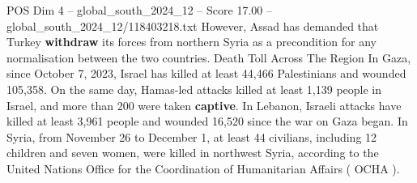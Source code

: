 \begin{textsample}{POS Dim 4 – global\_south\_2024\_12 – Score 17.00 – global\_south\_2024\_12/118403218.txt}
However, Assad has demanded that Turkey \textbf{withdraw} its forces from northern Syria as a precondition for any normalisation between the two countries.
Death Toll Across The Region In Gaza, since October 7, 2023, Israel has killed at least 44,466 Palestinians and wounded 105,358.
On the same day, Hamas-led attacks killed at least 1,139 people in Israel, and more than 200 were taken \textbf{captive}.
In Lebanon, Israeli attacks have killed at least 3,961 people and wounded 16,520 since the war on Gaza began.
In Syria, from November 26 to December 1, at least 44 civilians, including 12 children and seven women, were killed in northwest Syria, according to the United Nations Office for the Coordination of Humanitarian Affairs ( OCHA ).

\end{textsample}
